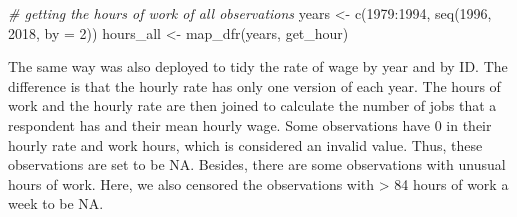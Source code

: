 \documentclass{article}
\newenvironment{Shaded}{\begin{snugshade}}{\end{snugshade}}
\newcommand{\AttributeTok}[1]{\textcolor[rgb]{0.77,0.63,0.00}{#1}}
\newcommand{\CommentTok}[1]{\textcolor[rgb]{0.56,0.35,0.01}{\textit{#1}}}
\newcommand{\DecValTok}[1]{\textcolor[rgb]{0.00,0.00,0.81}{#1}}
\newcommand{\FunctionTok}[1]{\textcolor[rgb]{0.00,0.00,0.00}{#1}}
\newcommand{\NormalTok}[1]{#1}
\newcommand{\OtherTok}[1]{\textcolor[rgb]{0.56,0.35,0.01}{#1}}
\newcommand{\SpecialCharTok}[1]{\textcolor[rgb]{0.00,0.00,0.00}{#1}}
\begin{document}
\begin{Shaded}
\begin{Highlighting}[]
\CommentTok{\# getting the hours of work of all observations}
\NormalTok{years }\OtherTok{\textless{}{-}} \FunctionTok{c}\NormalTok{(}\DecValTok{1979}\SpecialCharTok{:}\DecValTok{1994}\NormalTok{, }\FunctionTok{seq}\NormalTok{(}\DecValTok{1996}\NormalTok{, }\DecValTok{2018}\NormalTok{, }\AttributeTok{by =} \DecValTok{2}\NormalTok{))}
\NormalTok{hours\_all }\OtherTok{\textless{}{-}} \FunctionTok{map\_dfr}\NormalTok{(years, get\_hour)}
\end{Highlighting}
\end{Shaded}

The same way was also deployed to tidy the rate of wage by year and by ID. The difference is that the hourly rate has only one version of each year. The hours of work and the hourly rate are then joined to calculate the number of jobs that a respondent has and their mean hourly wage. Some observations have 0 in their hourly rate and work hours, which is considered an invalid value. Thus, these observations are set to be NA. Besides, there are some observations with unusual hours of work. Here, we also censored the observations with \textgreater{} 84 hours of work a week to be NA.
\end{document}
